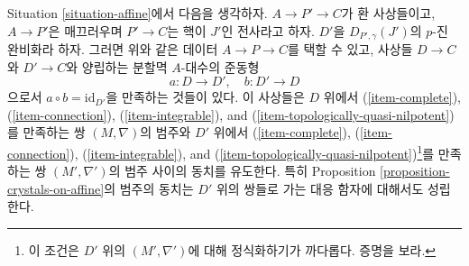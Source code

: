 \begin{lemma}
\label{lemma-crystals-on-affine-smooth}
Situation \ref{situation-affine}에서 다음을 생각하자.
$A \to P' \to C$가 환 사상들이고, $A \to P'$은 매끄러우며
$P' \to C$는 핵이 $J'$인 전사라고 하자. $D'$을
$D_{P', \gamma}(J')$의 $p$-진 완비화라 하자. 그러면 위와 같은
데이터 $A \to P \to C$를 택할 수 있고, 사상들 $D \to C$와
$D' \to C$와 양립하는 분할멱 $A$-대수의 준동형
$$
a : D \longrightarrow D',\quad b : D' \longrightarrow D
$$
으로서 $a \circ b = \text{id}_{D'}$을 만족하는 것들이 있다.
이 사상들은 $D$ 위에서 (\ref{item-complete}),
(\ref{item-connection}), (\ref{item-integrable}), and
(\ref{item-topologically-quasi-nilpotent})를 만족하는 쌍 $(M, \nabla)$의
범주와 $D'$ 위에서 (\ref{item-complete}), (\ref{item-connection}),
(\ref{item-integrable}), and
(\ref{item-topologically-quasi-nilpotent})\footnote{이 조건은 $D'$ 위의
$(M', \nabla')$에 대해 정식화하기가 까다롭다. 증명을 보라.}를
만족하는 쌍 $(M', \nabla')$의 범주 사이의 동치를 유도한다.
특히 Proposition \ref{proposition-crystals-on-affine}의 범주의 동치는
$D'$ 위의 쌍들로 가는 대응 함자에 대해서도 성립한다.
\end{lemma}

